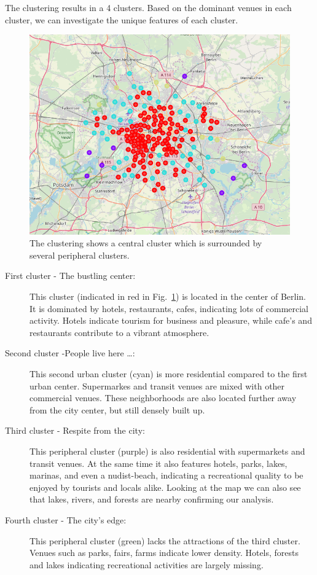 \documentclass[letter]{scrartcl}
\begin{document}
\clearpage

The clustering results in a 4 clusters. Based on the dominant venues in each cluster, we can investigate the unique features of each cluster.  

\begin{figure}[h!]
\centering
\includegraphics[width=12cm]{../Figures/Clusters.PNG}
\caption{The clustering shows a central cluster which is surrounded by several peripheral clusters.}\label{fig:clusters}
\end{figure}

\begin{description}
	\item[First cluster - The bustling center:] This cluster (indicated in red in Fig.~\ref{fig:clusters}) is located in the center of Berlin. It is dominated by hotels, restaurants, cafes, indicating lots of commercial activity. Hotels indicate tourism for business and pleasure, while cafe's and restaurants contribute to a vibrant atmosphere.  
	\item[Second cluster -People live here \ldots:] This second urban cluster (cyan) is more residential compared to the first urban center. Supermarkes and transit venues are mixed with other commercial venues. These neighborhoods are also located further away from the city center, but still densely built up.
	\item[Third cluster - Respite from the city:] This peripheral cluster (purple) is also  residential with supermarkets and transit venues. At the same time it also features hotels, parks, lakes, marinas, and even a nudist-beach, indicating a recreational quality to be enjoyed by tourists and locals alike. Looking at the map we can also see that lakes, rivers, and forests are nearby confirming our analysis.	
	\item[Fourth cluster -  The city's edge:] This peripheral cluster (green) lacks the attractions of the third cluster. Venues such as parks, fairs, farms indicate lower density. Hotels, forests and lakes indicating recreational activities are largely missing.  
\end{description}
\end{document}
